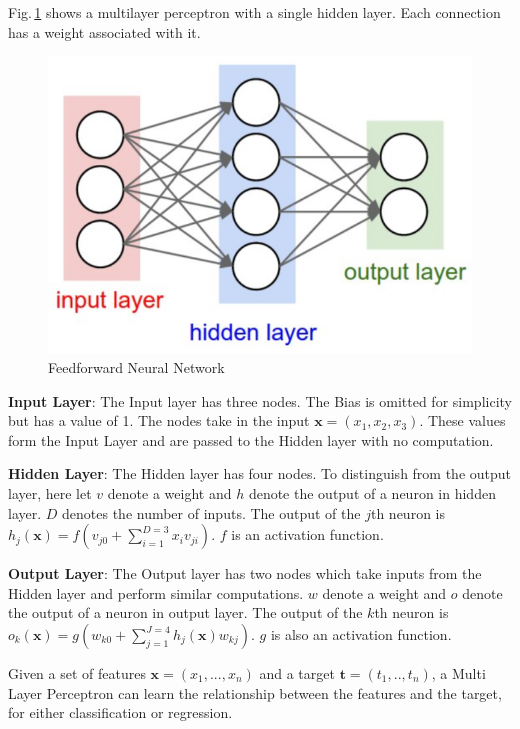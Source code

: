 Fig.\,\ref{one_layer} shows a multilayer perceptron with a single hidden layer. Each connection has a weight associated with it.

\begin{figure}[h]
	\centering
	\includegraphics[scale=0.5]{Figs/1hidden.png}
    \caption{Feedforward Neural Network}
    \label{one_layer}
\end{figure}


\textbf{Input Layer}: The Input layer has three nodes. The Bias is omitted for simplicity but has a value of 1. The nodes take in the input $\mathbf{x} = (x_1,x_2,x_3)$. These values form the Input Layer and are passed to the Hidden layer with no computation.

\textbf{Hidden Layer}: The Hidden layer has four nodes. To distinguish from the output layer, here let $v$ denote a weight and $h$ denote the output of a neuron in hidden layer. $D$ denotes the number of inputs. The output of the $j$th neuron is $h_j(\mathbf{x}) = f(v_{j0}+\sum_{i=1}^{D=3} x_iv_{ji})$. $f$ is an activation function.

\textbf{Output Layer}: The Output layer has two nodes which take inputs from the Hidden layer and perform similar computations.
$w$ denote a weight and $o$ denote the output of a neuron in output layer. The output of the $k$th neuron is $o_k(\mathbf{x}) = g(w_{k0}+\sum_{j=1}^{J=4} h_j(\mathbf{x}) w_{kj})$. $g$ is also an activation function.

Given a set of features $\mathbf{x} = (x_1,...,x_n)$ and a target $\mathbf{t} = (t_1,..,t_n)$, a Multi Layer Perceptron can learn the relationship between the features and the target, for either classification or regression.

